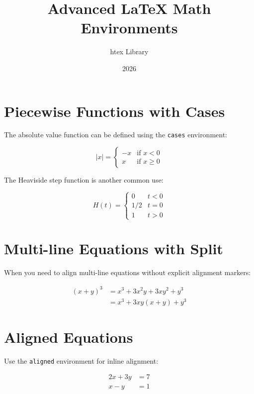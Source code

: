 \documentclass{article}
\title{Advanced LaTeX Math Environments}
\author{htex Library}
\date{2026}
\begin{document}
\maketitle

\section{Piecewise Functions with Cases}

The absolute value function can be defined using the \texttt{cases} environment:

\begin{equation}
|x| = \begin{cases}
  -x & \text{if } x < 0 \\
  x & \text{if } x \geq 0
\end{cases}
\end{equation}

The Heaviside step function is another common use:

\begin{equation}
H(t) = \begin{cases}
  0 & t < 0 \\
  1/2 & t = 0 \\
  1 & t > 0
\end{cases}
\end{equation}

\section{Multi-line Equations with Split}

When you need to align multi-line equations without explicit alignment markers:

\begin{equation}
\begin{split}
(x + y)^3 &= x^3 + 3x^2y + 3xy^2 + y^3 \\
&= x^3 + 3xy(x + y) + y^3
\end{split}
\end{equation}

\section{Aligned Equations}

Use the \texttt{aligned} environment for inline alignment:

\begin{equation}
\begin{aligned}
2x + 3y &= 7 \\
x - y &= 1
\end{aligned}
\end{equation}
\end{document}
